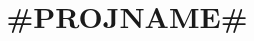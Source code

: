 \documentclass{article}
\title{#PROJNAME#}
\begin{document}
\maketitle

\begin{abstract}

\end{abstract}

%
%
\end{document}
